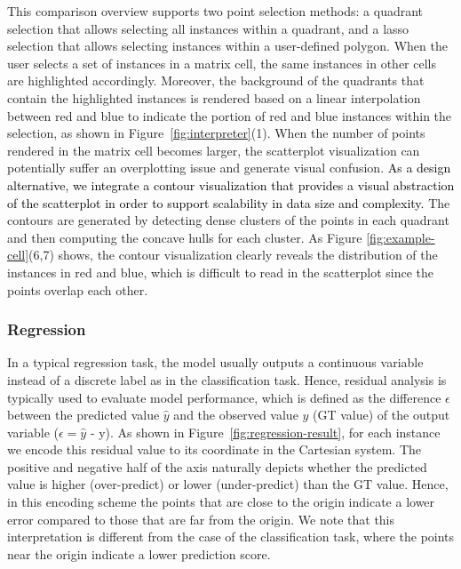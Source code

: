 \documentclass[preprint,journal]{vgtc}       %
\newcommand{\revcolor}{black}
\begin{document}
This comparison overview supports two point selection methods: a quadrant selection that allows selecting all instances within a quadrant, and a lasso selection that allows selecting instances within a user-defined polygon. When the user selects a set of instances in a matrix cell, the same instances in other cells are highlighted accordingly. Moreover, the background of the quadrants that contain the highlighted instances is rendered based on a linear interpolation between red and blue to indicate the portion of red and blue instances within the selection, as shown in Figure~\ref{fig:interpreter}(1). When the number of points rendered in the matrix cell becomes larger, the scatterplot visualization can potentially suffer an overplotting issue and generate visual confusion. \textcolor{\revcolor}{As a design alternative, we integrate a contour visualization that provides a visual abstraction of the scatterplot in order to support scalability in data size and complexity.} The contours are generated by detecting dense clusters of the points in each quadrant and then computing the concave hulls for each cluster. As Figure \ref{fig:example-cell}(6,7) shows, the contour visualization clearly reveals the distribution of the instances in red and blue, which is difficult to read in the scatterplot since the points overlap each other.

\subsubsection{Regression}
\label{des:regression}
In a typical regression task, the model usually outputs a continuous variable instead of a discrete label as in the classification task. Hence, residual analysis is typically used to evaluate model performance, which is defined as the difference $\epsilon$ between the predicted value $\hat y$ and the observed value $y$ (GT value) of the output variable ($\epsilon = \hat y$ - y). As shown in Figure~\ref{fig:regression-result}, for each instance we encode this residual value to its coordinate in the Cartesian system. The positive and negative half of the axis naturally depicts whether the predicted value is higher (over-predict) or lower (under-predict) than the GT value. Hence, in this encoding scheme the points that are close to the origin indicate a lower error compared to those that are far from the origin. We note that this interpretation is different from the case of the classification task, where the points near the origin indicate a lower prediction score.
\end{document}
